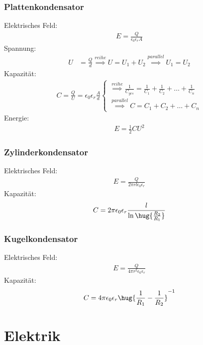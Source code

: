 \documentclass[twocolumn]{summery_3.1}
\begin{document}
\subsubsection{Plattenkondensator}
Elektrisches Feld:
\begin{align*}
    E = \frac{Q}{\epsilon_0\epsilon_r A}
\end{align*}
Spannung:
\begin{align*}
    U &= \frac Qd \overset{reihe}{\implies}U =U_1+U_2 \overset{parallel}{\implies} U_1=U_2
\end{align*}
Kapazität:
\begin{align*}
    C = \frac{Q}{U} = \epsilon_0\epsilon_r \frac{A}{d} 
    \begin{cases}
        \overset{reihe}{\implies} \frac{1}{C_{ges}}= \frac{1}{C_1} + \frac{1}{C_2} + \dots + \frac{1}{C_n}\\
        \overset{parallel}{\implies} C=C_1 + C_2 + \dots + C_n
    \end{cases}
\end{align*}
Energie:
\begin{align*}
    E = \frac12 CU^2
\end{align*}

\subsubsection{Zylinderkondensator}
Elektrisches Feld:
\begin{align*}
    E = \frac{Q}{2\pi r l \epsilon_0\epsilon_r}
\end{align*}
Kapazität:
\begin{align*}
    C = 2\pi \epsilon_0\epsilon_r \frac{l}{\ln\hug{\frac{R_2}{R_1}}} 
\end{align*}

\subsubsection{Kugelkondensator}
Elektrisches Feld:
\begin{align*}
    E = \frac{Q}{4\pi r^2 \epsilon_0\epsilon_r}
\end{align*}
Kapazität:
\begin{align*}
    C = 4\pi \epsilon_0\epsilon_r\hug{\frac{1}{R_1} - \frac{1}{R_2}}^{-1} 
\end{align*}

\section{Elektrik}
\end{document}
